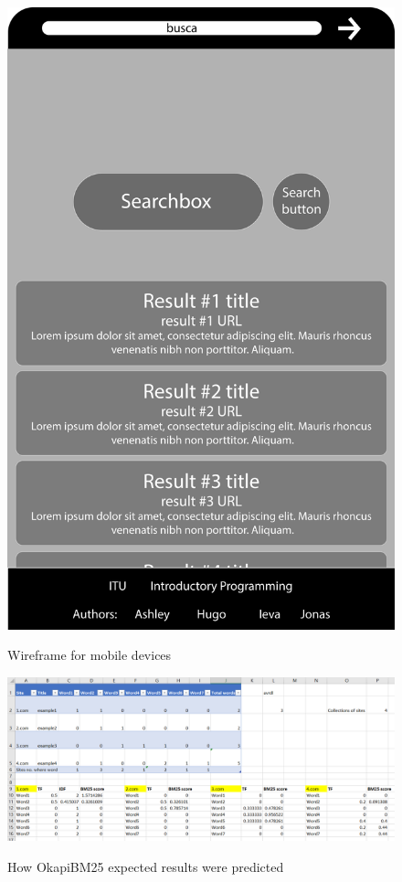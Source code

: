 \begin{figure}[p]
    \centering
    \caption{Wireframe for mobile devices}
    \includegraphics[scale=0.4]{figures/Wireframe_for_mobile_browser.png}
\label{fig:WireframeMobile}
\end{figure}

\begin{figure}
    \centering
    \caption{How OkapiBM25 expected results were predicted}
    \includegraphics[scale=0.7]{figures/How-calculated-OkapiBM25-tests.png}
    \label{fig:calculations}
\end{figure}